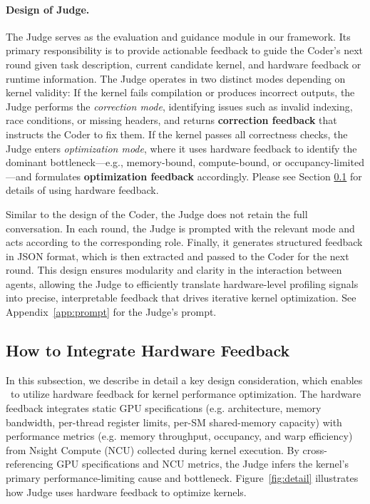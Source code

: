 \paragraph{Design of Judge.} 
The {Judge} serves as the evaluation and guidance module in our framework. 
Its primary responsibility is to provide actionable feedback to guide the Coder’s next round given task description, current candidate kernel, and hardware feedback or runtime information. 
The Judge operates in two distinct modes depending on kernel validity:
If the kernel fails compilation or produces incorrect outputs, the Judge performs the {\it correction mode}, identifying issues such as invalid indexing, race conditions, or missing headers, and returns \textbf{correction feedback} that instructs the Coder to fix them. 
If the kernel passes all correctness checks, the Judge enters {\it  optimization mode}, where it uses hardware feedback  to identify the dominant bottleneck—e.g., memory-bound, compute-bound, or occupancy-limited—and formulates \textbf{optimization feedback} accordingly. Please see Section \ref{sec:searching} for details of using hardware feedback. 

Similar to the design of the Coder, the Judge does not retain the full conversation. 
In each round, the Judge is prompted with the relevant mode and acts according to the corresponding role. Finally, it generates structured feedback in JSON format, which is then extracted and passed to the Coder for the next round. 
This design ensures modularity and clarity in the interaction between agents, allowing the Judge to efficiently translate hardware-level profiling signals into precise, interpretable feedback that drives iterative kernel optimization. See Appendix~\ref{app:prompt} for the Judge's prompt.


\vspace{-12pt}


\subsection{How to Integrate Hardware Feedback}\label{sec:searching}
\vspace{-8pt}
In this subsection,  we describe in detail a key design consideration, which enables \agentname~to utilize hardware feedback for kernel performance optimization.
The {hardware feedback} integrates static GPU specifications (e.g. architecture, memory bandwidth, per-thread register limits, per-SM shared-memory capacity) with performance metrics (e.g. memory throughput, occupancy, and warp efficiency) from {Nsight Compute (NCU)} collected during kernel execution. By cross-referencing GPU specifications and NCU metrics, the Judge infers the kernel’s primary performance-limiting cause and bottleneck. Figure~\ref {fig:detail} illustrates how Judge uses hardware feedback to optimize kernels.


